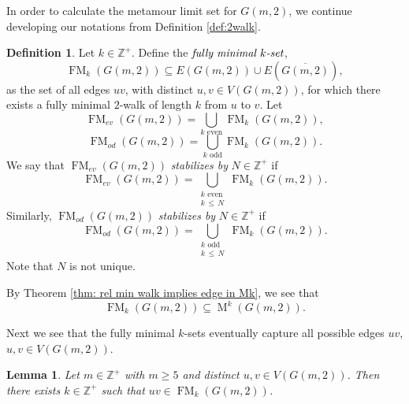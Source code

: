 \documentclass[12pt]{amsart}
\newtheorem{lemma}[theorem]{Lemma}
\theoremstyle{definition}
\newtheorem{definition}[theorem]{Definition}
\theoremstyle{remark}
\numberwithin{equation}{section}
\numberwithin{figure}{section}
\newcommand{\M}{\operatorname{M}}
\newcommand{\FM}{\operatorname{FM}}
\newcommand{\Z}{\mathbb{Z}}
\begin{document}
In order to calculate the metamour limit set for $G(m,2)$, we continue developing our notations from Definition \ref{def:2walk}. 
\begin{definition} \label{def: Petersen fully minimal edges}
    Let $k\in\Z^+$. Define the $\emph{fully minimal $k$-set}$, 
    \[ \FM_k(G(m,2)) \subseteq E(G(m,2)) \cup E(\overline{G(m,2)}), \]
    as the set of all edges $uv$, with distinct $u,v\in V(G(m,2))$, for which there exists a fully minimal $2$-walk of length $k$ from $u$ to $v$. 
    Let
    \[ \FM_{ev}(G(m,2)) = \bigcup_{k \text{ even}} \FM_k(G(m,2)), \]
    \[ \FM_{od}(G(m,2)) = \bigcup_{k\text{ odd}} \FM_k(G(m,2)). \]
    We say that $\FM_{ev}(G(m,2))$ \emph{stabilizes by} $N\in\Z^+$ if
    \[ \FM_{ev}(G(m,2)) = \bigcup\limits_{\substack{k \text{ even} \\ k\,\le\, N}} \FM_k(G(m,2)). \]
    Similarly, $\FM_{od}(G(m,2))$ \emph{stabilizes by} $N\in\Z^+$ if
    \[ \FM_{od}(G(m,2)) = \bigcup\limits_{\substack{k \text{ odd} \\ k\,\le\, N}} \FM_k(G(m,2)). \]
    Note that $N$ is not unique.
\end{definition}
By Theorem \ref{thm: rel min walk implies edge in Mk}, we see that
\[ \FM_k(G(m,2)) \subseteq \M^k(G(m,2)). \]

Next we see that the fully minimal $k$-sets eventually capture all possible edges $uv$, $u,v\in V(G(m,2))$. 
\begin{lemma} \label{lem: Petersen all fully minimal}
    Let $m\in\Z^+$ with $m\geq 5$ and distinct $u,v\in V(G(m,2))$. Then there exists $k\in\Z^+$ such that $uv\in \FM_k(G(m,2))$.
\end{lemma}
\end{document}
